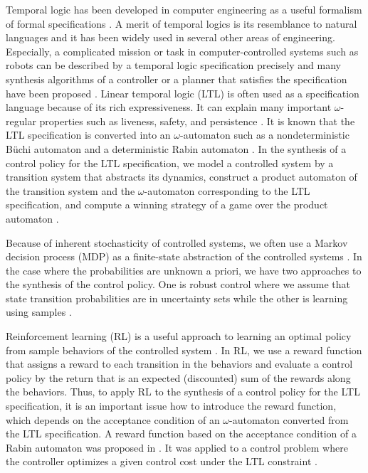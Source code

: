 Temporal logic has been developed in computer engineering as a useful formalism of formal specifications  \cite{BK2008,Clarke2018}.
A merit of temporal logics is its resemblance to natural languages and it has been widely used in several other areas of engineering. Especially, a complicated mission or task in computer-controlled systems such as robots can be described by a temporal logic specification precisely and many synthesis algorithms of a controller or a planner that satisfies the specification have been proposed \cite{KB2008,Gazit2009,WTM2012a,SU2018}.
Linear temporal logic (LTL) is often used as a specification language because of its rich expressiveness.  It can explain many important $\omega$-regular properties such as liveness, safety, and persistence \cite{BK2008}.
It is known that the LTL specification is converted into an $\omega$-automaton such as a nondeterministic B\"{u}chi automaton and a deterministic Rabin automaton \cite{BK2008,Belta2017}.
In the synthesis of a control policy for the LTL specification,  we model a controlled system by a transition system that abstracts its dynamics, construct a product automaton of the transition system and the $\omega$-automaton corresponding to the LTL specification, and compute a winning strategy of a game over the product automaton \cite{Belta2017}.

Because of inherent stochasticity of controlled systems, we often use a Markov decision process (MDP) as a finite-state abstraction of the controlled systems \cite{Puterman}.
In the case where the probabilities are unknown a priori, we have two approaches to the synthesis of the control policy. One is robust control where we assume that state transition probabilities are in uncertainty sets \cite{WTM2012} while the other is learning using samples \cite{Sadigh2014}.

Reinforcement learning (RL) is a useful approach to learning an optimal policy from sample behaviors of the controlled system \cite{Sutton}.
In RL, we use a reward function that assigns a reward to each transition in the behaviors and evaluate a control policy by the return that is an expected (discounted) sum of the rewards along the behaviors.
Thus, to apply RL to the synthesis of a control policy for the LTL specification, it is an important issue how to introduce the reward function, which depends on the acceptance condition of an $\omega$-automaton converted from the LTL specification.
A reward function based on the acceptance condition of a Rabin automaton was proposed in \cite{Sadigh2014}. It was applied to a control problem where the controller optimizes a given control cost under the LTL constraint \cite{HU2015}.

